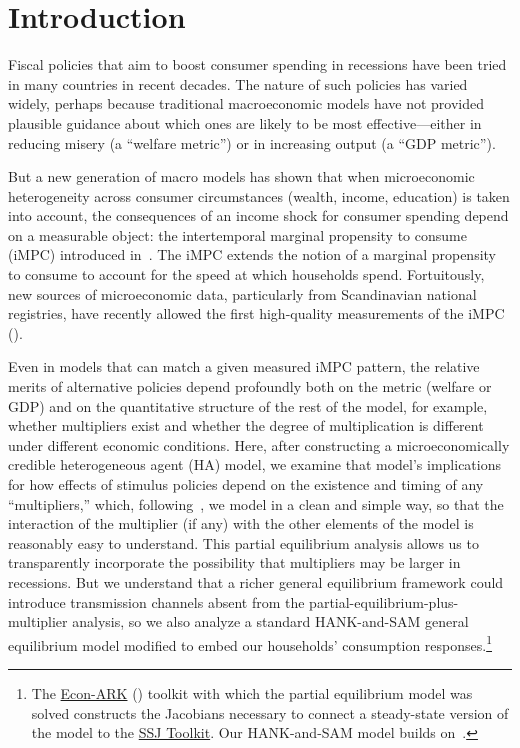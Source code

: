 \documentclass{econsocart}
\begin{document}
\section{Introduction}
\whenintegrated{\label{sec:intro}} %
\setcounter{page}{0}

Fiscal policies that aim to boost consumer spending in recessions have been tried in many countries in recent decades.  The nature of such policies has varied widely, perhaps because traditional macroeconomic models have not provided plausible guidance about which ones are likely to be most effective---either in reducing misery (a ``welfare metric'') or in increasing output (a ``GDP metric'').

But a new generation of macro models has shown that when microeconomic heterogeneity across consumer circumstances (wealth, income, education) is taken into account, the consequences of an income shock for consumer spending depend on a measurable object: the intertemporal marginal propensity to consume (iMPC) introduced in~\cite{auclert2024IKC}.  The iMPC extends the notion of a marginal propensity to consume to account for the speed at which households spend.  Fortuitously, new sources of microeconomic data, particularly from Scandinavian national registries, have recently allowed the first high-quality measurements of the iMPC (\cite{fagereng-mpc-2021}).

Even in models that can match a given measured iMPC pattern, the relative merits of alternative policies depend profoundly both on the metric (welfare or GDP) and on the quantitative structure of the rest of the model, for example, whether multipliers exist and whether the degree of multiplication is different under different economic conditions. Here, after constructing a microeconomically credible heterogeneous agent (HA) model, we examine that model's implications for how effects of stimulus policies depend on the existence and timing of any ``multipliers,'' which, following~\cite{kmpHandbook}, we model in a clean and simple way, so that the interaction of the multiplier (if any) with the other elements of the model is reasonably easy to understand.
This partial equilibrium analysis allows us to transparently incorporate the possibility that multipliers may be larger in recessions.  But we understand that a richer general equilibrium framework could introduce transmission channels absent from the partial-equilibrium-plus-multiplier analysis, so we also analyze a standard HANK-and-SAM general equilibrium model modified to embed our households' consumption responses.\footnote{The \href{https://econ-ark.org}{Econ-ARK} (\cite{carroll_et_al-proc-scipy-2018}) toolkit with which the partial equilibrium model was solved constructs the Jacobians necessary to connect a steady-state version of the model to the \href{https://github.com/shade-econ/sequence-jacobian}{SSJ Toolkit}. Our HANK-and-SAM model builds on~\cite{Ravn2017,Ravn2021}.}
\end{document}
